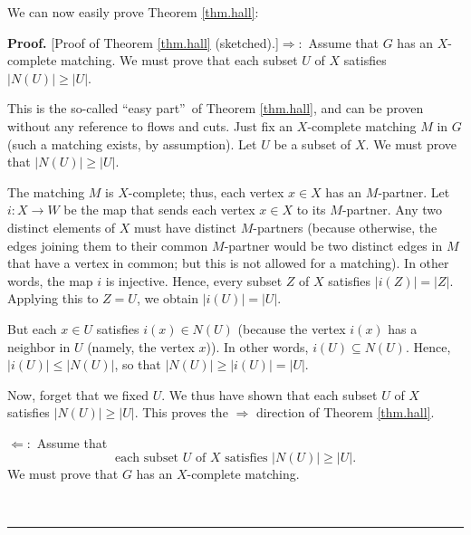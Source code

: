 \documentclass[numbers=enddot,12pt,final,onecolumn,notitlepage]{scrartcl}%
\theoremstyle{definition}
\newenvironment{proof}[1][Proof]{\noindent\textbf{#1.} }{\ \rule{0.5em}{0.5em}}
\begin{document}
We can now easily prove Theorem \ref{thm.hall}:

\begin{proof}
[Proof of Theorem \ref{thm.hall} (sketched).]$\Longrightarrow:$ Assume that
$G$ has an $X$-complete matching. We must prove that each subset $U$ of $X$
satisfies $\left\vert N\left(  U\right)  \right\vert \geq\left\vert
U\right\vert $.

This is the so-called \textquotedblleft easy part\textquotedblright\ of
Theorem \ref{thm.hall}, and can be proven without any reference to flows and
cuts. Just fix an $X$-complete matching $M$ in $G$ (such a matching exists, by
assumption). Let $U$ be a subset of $X$. We must prove that $\left\vert
N\left(  U\right)  \right\vert \geq\left\vert U\right\vert $.

The matching $M$ is $X$-complete; thus, each vertex $x\in X$ has an
$M$-partner. Let $i:X\rightarrow W$ be the map that sends each vertex $x\in X$
to its $M$-partner. Any two distinct elements of $X$ must have distinct
$M$-partners (because otherwise, the edges joining them to their common
$M$-partner would be two distinct edges in $M$ that have a vertex in common;
but this is not allowed for a matching). In other words, the map $i$ is
injective. Hence, every subset $Z$ of $X$ satisfies $\left\vert i\left(
Z\right)  \right\vert =\left\vert Z\right\vert $. Applying this to $Z=U$, we
obtain $\left\vert i\left(  U\right)  \right\vert =\left\vert U\right\vert $.

But each $x\in U$ satisfies $i\left(  x\right)  \in N\left(  U\right)  $
(because the vertex $i\left(  x\right)  $ has a neighbor in $U$ (namely, the
vertex $x$)). In other words, $i\left(  U\right)  \subseteq N\left(  U\right)
$. Hence, $\left\vert i\left(  U\right)  \right\vert \leq\left\vert N\left(
U\right)  \right\vert $, so that $\left\vert N\left(  U\right)  \right\vert
\geq\left\vert i\left(  U\right)  \right\vert =\left\vert U\right\vert $.

Now, forget that we fixed $U$. We thus have shown that each subset $U$ of $X$
satisfies $\left\vert N\left(  U\right)  \right\vert \geq\left\vert
U\right\vert $. This proves the $\Longrightarrow$ direction of Theorem
\ref{thm.hall}.

$\Longleftarrow:$ Assume that
\begin{equation}
\text{each subset }U\text{ of }X\text{ satisfies }\left\vert N\left(
U\right)  \right\vert \geq\left\vert U\right\vert .
\label{pf.thm.hall.hard.ass}%
\end{equation}
We must prove that $G$ has an $X$-complete matching.


\end{proof}
\end{document}
